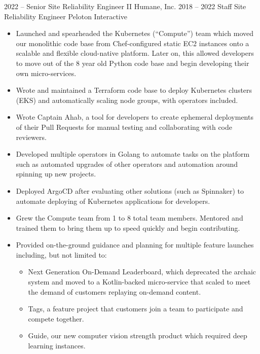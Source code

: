 \documentclass[9pt]{developercv}
\begin{document}


\begin{entrylist}
	\entry
		{2022 -- }
		{Senior Site Reliability Engineer II}
		{Humane, Inc.}
		{
		}
	\entry
		{2018 -- 2022}
		{Staff Site Reliability Engineer}
		{Peloton Interactive}
		{
		  \begin{itemize}
			\item Launched and spearheaded the Kubernetes (``Compute'') team which moved our monolithic code base from Chef-configured static EC2 instances onto a scalable and flexible cloud-native platform. Later on, this allowed developers to move out of the 8 year old Python code base and begin developing their own micro-services.
			\item Wrote and maintained a Terraform code base to deploy Kubernetes clusters (EKS) and automatically scaling node groups, with operators included.
			\item Wrote Captain Ahab, a tool for developers to create ephemeral deployments of their Pull Requests for manual testing and collaborating with code reviewers.
			\item Developed multiple operators in Golang to automate tasks on the platform such as automated upgrades of other operators and automation around spinning up new projects.
			\item Deployed ArgoCD after evaluating other solutions (such as Spinnaker) to automate deploying of Kubernetes applications for developers.
			\item Grew the Compute team from 1 to 8 total team members. Mentored and trained them to bring them up to speed quickly and begin contributing.
			\item Provided on-the-ground guidance and planning for multiple feature launches including, but not limited to:
				  \begin{itemize}
					\item Next Generation On-Demand Leaderboard, which deprecated the archaic system and moved to a Kotlin-backed micro-service that scaled to meet the demand of customers replaying on-demand content.
					\item Tags, a feature project that customers join a team to participate and compete together.
					\item Guide, our new computer vision strength product which required deep learning instances.

\end{itemize}
\end{itemize}}
\end{entrylist}
\end{document}
